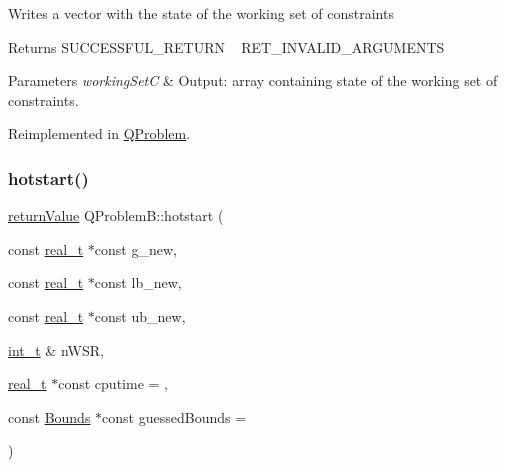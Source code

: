 Writes a vector with the state of the working set of constraints \begin{DoxyReturn}{Returns}
S\+U\+C\+C\+E\+S\+S\+F\+U\+L\+\_\+\+R\+E\+T\+U\+RN ~\newline
 R\+E\+T\+\_\+\+I\+N\+V\+A\+L\+I\+D\+\_\+\+A\+R\+G\+U\+M\+E\+N\+TS 
\end{DoxyReturn}

\begin{DoxyParams}{Parameters}
{\em working\+SetC} & Output\+: array containing state of the working set of constraints. \\
\hline
\end{DoxyParams}


Reimplemented in \hyperlink{class_q_problem_a9aff2accd586086d0a3113eba9b73678}{Q\+Problem}.

\mbox{\label{class_q_problem_b_a2ab20f136824346f73866aa2140ebe7b}} 
\subsubsection{\texorpdfstring{hotstart()}{hotstart()}\hspace{0.1cm}{\footnotesize\ttfamily [1/2]}}
{\footnotesize\ttfamily \hyperlink{_message_handling_8hpp_a81d556f613bfbabd0b1f9488c0fa865e}{return\+Value} Q\+Problem\+B\+::hotstart (\begin{DoxyParamCaption}\item[{const \hyperlink{qp_o_a_s_e_s__wrapper_8h_a0d00e2b3dfadee81331bbb39068570c4}{real\+\_\+t} $\ast$const}]{g\+\_\+new,  }\item[{const \hyperlink{qp_o_a_s_e_s__wrapper_8h_a0d00e2b3dfadee81331bbb39068570c4}{real\+\_\+t} $\ast$const}]{lb\+\_\+new,  }\item[{const \hyperlink{qp_o_a_s_e_s__wrapper_8h_a0d00e2b3dfadee81331bbb39068570c4}{real\+\_\+t} $\ast$const}]{ub\+\_\+new,  }\item[{\hyperlink{_types_8hpp_ab6fd6105e64ed14a0c9281326f05e623}{int\+\_\+t} \&}]{n\+W\+SR,  }\item[{\hyperlink{qp_o_a_s_e_s__wrapper_8h_a0d00e2b3dfadee81331bbb39068570c4}{real\+\_\+t} $\ast$const}]{cputime = {},  }\item[{const \hyperlink{class_bounds}{Bounds} $\ast$const}]{guessed\+Bounds = {} }\end{DoxyParamCaption})}

